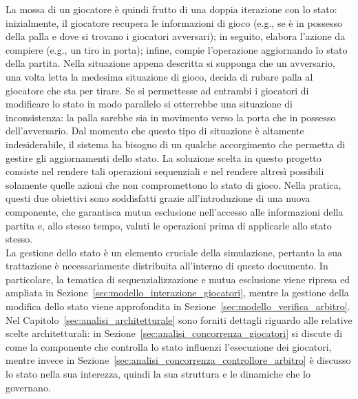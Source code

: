 La mossa di un giocatore è quindi frutto di una doppia iterazione con lo stato: inizialmente, il giocatore recupera le informazioni di gioco (e.g., se è in possesso della palla e dove si trovano i giocatori avversari); in seguito, elabora l'azione da compiere (e.g., un tiro in porta); infine, compie l'operazione aggiornando lo stato della partita. Nella situazione appena descritta si supponga che un avversario, una volta letta la medesima situazione di gioco, decida di rubare palla al giocatore che sta per tirare. Se si permettesse ad entrambi i giocatori di modificare lo stato in modo parallelo si otterrebbe una situazione di inconsistenza: la palla sarebbe sia in movimento verso la porta che in possesso dell'avversario.
Dal momento che questo tipo di situazione è altamente indesiderabile, il sistema ha bisogno di un qualche accorgimento che permetta di gestire gli aggiornamenti dello stato. La soluzione scelta in questo progetto consiste nel rendere tali operazioni sequenziali e nel rendere altresì possibili solamente quelle azioni che non compromettono lo stato di gioco. Nella pratica, questi due obiettivi sono soddisfatti grazie all'introduzione di una nuova componente, che garantisca mutua esclusione nell'accesso alle informazioni della partita e, allo stesso tempo, valuti le operazioni prima di applicarle allo stato stesso.\\

La gestione dello stato è un elemento cruciale della simulazione, pertanto la sua trattazione è necessariamente distribuita all'interno di questo documento. In particolare, la tematica di sequenzializzazione e mutua esclusione viene ripresa ed ampliata in Sezione~\ref{sec:modello_interazione_giocatori}, mentre la gestione della modifica dello stato viene approfondita in Sezione~\ref{sec:modello_verifica_arbitro}. Nel Capitolo~\ref{sec:analisi_architetturale} sono forniti dettagli riguardo alle relative scelte architetturali: in Sezione~\ref{sec:analisi_concorrenza_giocatori} si discute di come la componente che controlla lo stato influenzi l'esecuzione dei giocatori, mentre invece in Sezione~\ref{sec:analisi_concorrenza_controllore_arbitro} è discusso lo stato nella sua interezza, quindi la sua struttura e le dinamiche che lo governano.
